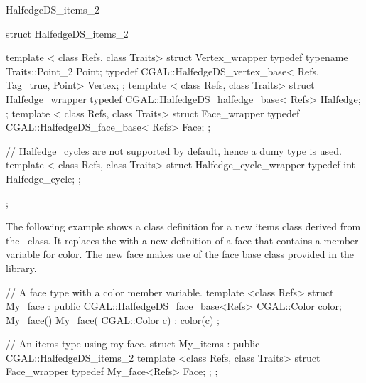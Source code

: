 \begin{ccRefClass}{HalfedgeDS_items_2}
\begin{ccExampleCode}
struct HalfedgeDS_items_2 {
    template < class Refs, class Traits>
    struct Vertex_wrapper {
        typedef typename Traits::Point_2 Point;
        typedef CGAL::HalfedgeDS_vertex_base< Refs, Tag_true, Point> Vertex;
    };
    template < class Refs, class Traits>
    struct Halfedge_wrapper {
        typedef CGAL::HalfedgeDS_halfedge_base< Refs> Halfedge;
    };
    template < class Refs, class Traits>
    struct Face_wrapper {
        typedef CGAL::HalfedgeDS_face_base< Refs> Face;
    };

    // Halfedge_cycles are not supported by default, hence a dumy type is used.
    template < class Refs, class Traits>
    struct Halfedge_cycle_wrapper {
        typedef int Halfedge_cycle;
    };
};
\end{ccExampleCode}

The following example shows a class definition for a new items class
derived from the \ccRefName\ class. It replaces the 
with a new definition of a face that contains a member variable for
color. The new face makes use of the face base class provided in the
library.

\begin{ccExampleCode}
// A face type with a color member variable.
template <class Refs>
struct My_face : public CGAL::HalfedgeDS_face_base<Refs> {
    CGAL::Color color;
    My_face() {}
    My_face( CGAL::Color c) : color(c) {}
};

// An items type using my face.
struct My_items : public CGAL::HalfedgeDS_items_2 {
    template <class Refs, class Traits>
    struct Face_wrapper {
        typedef My_face<Refs> Face;
    };
};
\end{ccExampleCode}

\end{ccRefClass}

\ccRefPageEnd

